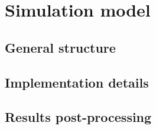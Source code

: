 \chapter{Simulation model}
\label{chap:simulation_model}

\section{General structure}
\section{Implementation details}
\section{Results post-processing}
